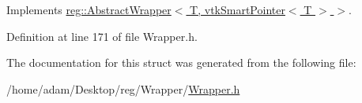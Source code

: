 Implements \hyperlink{structreg_1_1_abstract_wrapper_af017f2af039fd5b940345e930e4bb397}{reg\+::\+Abstract\+Wrapper$<$ T, vtk\+Smart\+Pointer$<$ T $>$ $>$}.



Definition at line 171 of file Wrapper.\+h.



The documentation for this struct was generated from the following file\+:\begin{DoxyCompactItemize}
\item 
/home/adam/\+Desktop/reg/\+Wrapper/\hyperlink{_wrapper_8h}{Wrapper.\+h}\end{DoxyCompactItemize}

